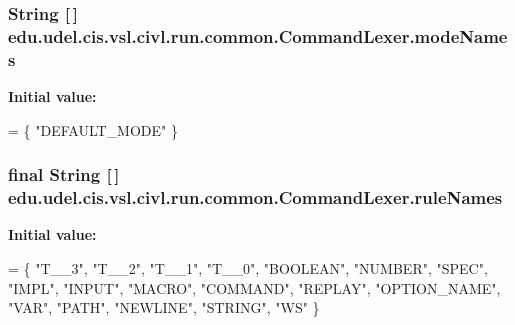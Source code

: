 \subsubsection[{mode\+Names}]{\setlength{\rightskip}{0pt plus 5cm}String \mbox{[}$\,$\mbox{]} edu.\+udel.\+cis.\+vsl.\+civl.\+run.\+common.\+Command\+Lexer.\+mode\+Names\hspace{0.3cm}{\ttfamily [static]}}\label{classedu_1_1udel_1_1cis_1_1vsl_1_1civl_1_1run_1_1common_1_1CommandLexer_af4e4495b0a453fdc8ec5171522a22005}
{\bfseries Initial value\+:}
\begin{DoxyCode}
= \{
        \textcolor{stringliteral}{"DEFAULT\_MODE"}
    \}
\end{DoxyCode}
\hypertarget{classedu_1_1udel_1_1cis_1_1vsl_1_1civl_1_1run_1_1common_1_1CommandLexer_a36795e3f6601a7ed975d2c1d21a9100f}{}
\subsubsection[{rule\+Names}]{\setlength{\rightskip}{0pt plus 5cm}final String \mbox{[}$\,$\mbox{]} edu.\+udel.\+cis.\+vsl.\+civl.\+run.\+common.\+Command\+Lexer.\+rule\+Names\hspace{0.3cm}{\ttfamily [static]}}\label{classedu_1_1udel_1_1cis_1_1vsl_1_1civl_1_1run_1_1common_1_1CommandLexer_a36795e3f6601a7ed975d2c1d21a9100f}
{\bfseries Initial value\+:}
\begin{DoxyCode}
= \{
        \textcolor{stringliteral}{"T\_\_3"}, \textcolor{stringliteral}{"T\_\_2"}, \textcolor{stringliteral}{"T\_\_1"}, \textcolor{stringliteral}{"T\_\_0"}, \textcolor{stringliteral}{"BOOLEAN"}, \textcolor{stringliteral}{"NUMBER"}, \textcolor{stringliteral}{"SPEC"}, \textcolor{stringliteral}{"IMPL"}, \textcolor{stringliteral}{"INPUT"}, 
        \textcolor{stringliteral}{"MACRO"}, \textcolor{stringliteral}{"COMMAND"}, \textcolor{stringliteral}{"REPLAY"}, \textcolor{stringliteral}{"OPTION\_NAME"}, \textcolor{stringliteral}{"VAR"}, \textcolor{stringliteral}{"PATH"}, \textcolor{stringliteral}{"NEWLINE"}, 
        \textcolor{stringliteral}{"STRING"}, \textcolor{stringliteral}{"WS"}
    \}
\end{DoxyCode}
\hypertarget{classedu_1_1udel_1_1cis_1_1vsl_1_1civl_1_1run_1_1common_1_1CommandLexer_a04b2be53f8a734a8d5de7e5753eb1628}{}
